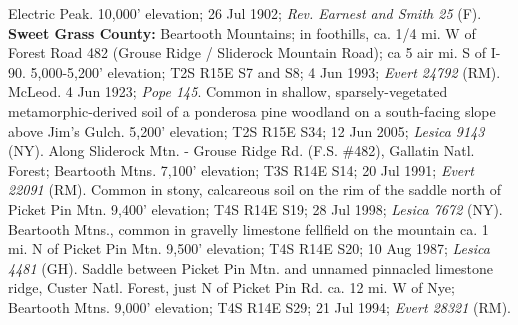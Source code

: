 Electric Peak. 10,000’ elevation; 26 Jul 1902;
\textit{Rev. Earnest and Smith 25} (F).
  \textbf{Sweet Grass County:}
Beartooth Mountains; in foothills, ca. 1/4 mi. W of Forest Road 482
(Grouse Ridge / Sliderock Mountain Road); ca 5 air mi. S of I-90. 5,000-5,200’
elevation; T2S R15E S7 and S8; 4 Jun 1993; \textit{Evert 24792} (RM).
McLeod. 4 Jun 1923; \textit{Pope 145}.
Common in shallow, sparsely-vegetated metamorphic-derived soil of a ponderosa
pine woodland on a south-facing slope above Jim's Gulch. 5,200’ elevation;
T2S R15E S34; 12 Jun 2005; \textit{Lesica 9143} (NY).
Along Sliderock Mtn. - Grouse Ridge Rd. (F.S. \#482), Gallatin Natl. Forest;
Beartooth Mtns. 7,100’ elevation; T3S R14E S14; 20 Jul 1991;
\textit{Evert 22091} (RM).
Common in stony, calcareous soil on the rim of the saddle north of Picket Pin
Mtn. 9,400’ elevation; T4S R14E S19; 28 Jul 1998; \textit{Lesica 7672} (NY).
Beartooth Mtns., common in gravelly limestone fellfield on the mountain ca.
1 mi. N of Picket Pin Mtn. 9,500’ elevation; T4S R14E S20; 10 Aug 1987;
\textit{Lesica 4481} (GH).
Saddle between Picket Pin Mtn. and unnamed pinnacled limestone ridge,
Custer Natl. Forest, just N of Picket Pin Rd. ca. 12 mi. W of Nye; Beartooth
Mtns. 9,000’ elevation; T4S R14E S29; 21 Jul 1994; \textit{Evert 28321} (RM).

